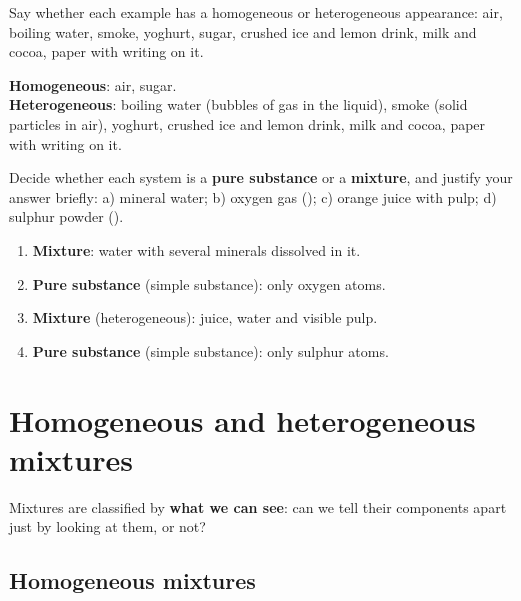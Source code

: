 \begin{exercise}
    Say whether each example has a homogeneous or heterogeneous appearance: air, boiling water, smoke, yoghurt, sugar, crushed ice and lemon drink, milk and cocoa, paper with writing on it.
    \begin{solu}
        \textbf{Homogeneous}: air, sugar. \\
        \textbf{Heterogeneous}: boiling water (bubbles of gas in the liquid), smoke (solid particles in air), yoghurt, crushed ice and lemon drink, milk and cocoa, paper with writing on it.
    \end{solu}
\end{exercise}

\begin{exercise}
    Decide whether each system is a \textbf{pure substance} or a \textbf{mixture}, and justify your answer briefly: a) mineral water; b) oxygen gas (); c) orange juice with pulp; d) sulphur powder ().
    \begin{solu}
        \begin{enumerate}[label=\alph*)]
            \item \textbf{Mixture}: water with several minerals dissolved in it.
            \item \textbf{Pure substance} (simple substance): only oxygen atoms.
            \item \textbf{Mixture} (heterogeneous): juice, water and visible pulp.
            \item \textbf{Pure substance} (simple substance): only sulphur atoms.
        \end{enumerate}
    \end{solu}
\end{exercise}


\section{Homogeneous and heterogeneous mixtures}

Mixtures are classified by \textbf{what we can see}: can we tell their components apart just by looking at them, or not?

\subsection{Homogeneous mixtures}

